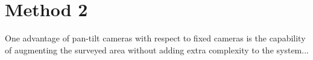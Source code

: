 \section{Method 2}
\label{sec:meth2}

One advantage of pan-tilt cameras with respect to fixed cameras is the capability of augmenting the surveyed area without adding extra complexity to the system...
